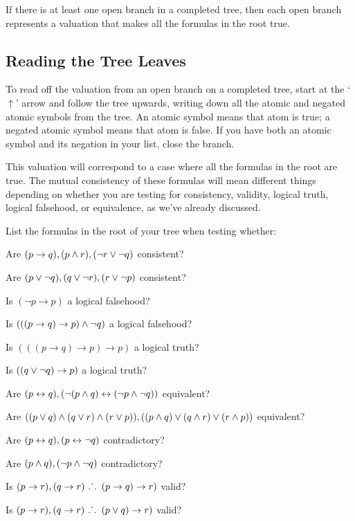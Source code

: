 \documentclass[PHIL101-Textbook.tex]{subfiles}
\begin{document}
If there is at least one open branch in a completed tree, then each open branch represents a valuation that makes all the formulas in the root true.

\subsection{Reading the Tree Leaves}

To read off the valuation from an open branch on a completed tree, start at the `$\uparrow$' arrow and follow the tree upwards, writing down all the atomic and negated atomic symbols from the tree. An atomic symbol means that atom is true; a negated atomic symbol means that atom is false. If you have both an atomic symbol and its negation in your list, close the branch.

This valuation will correspond to a case where all the formulas in the root are true. The mutual consistency of these formulas will mean different things depending on whether you are testing for consistency, validity, logical truth, logical falsehood, or equivalence, as we've already discussed.


\pagebreak
\practiceproblems

\noindent\solutions
\problempart \label{pr.tfl.root}
List the formulas in the root of your tree when testing whether:
\begin{earg}
\item Are $(p \rightarrow q), (p \land r), (\neg r \lor \neg q)$ consistent?
\item Are $(p \vee \neg q), (q \vee \neg r), (r \vee \neg p)$ consistent?
\item Is $(\neg p \to p)$ a logical falsehood?
\item Is $(((p\to q)\to p)\land\neg q)$ a logical falsehood?
\item Is $(((p\to q)\to p)\to p)$ a logical truth?
\item Is $((q \vee \neg q)\rightarrow p)$ a logical truth?
\item Are $(p \leftrightarrow q), (\neg (p \land q) \leftrightarrow (\neg p \land \neg q))$ equivalent?
\item Are $((p \vee q) \land (q \vee r) \land (r \vee p)), ((p \land q) \vee (q \land r) \vee (r \land p))$ equivalent?
\item Are $(p \leftrightarrow q), (p \leftrightarrow \neg q)$ contradictory?
\item Are $(p \land q), (\neg p \land \neg q)$ contradictory?
\item Is $(p\to r), (q\to r)\ \ldotp\dot{}\,\ldotp\ (p \rightarrow q) \to r)$ valid?
\item Is $(p\to r), (q\to r)\ \ldotp\dot{}\,\ldotp\ (p \vee q) \to r)$ valid?
\end{earg}
\end{document}
